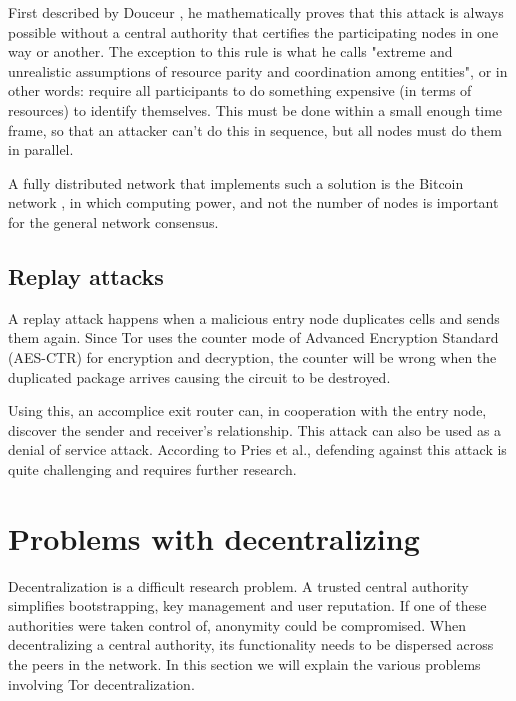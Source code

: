 \documentclass[12pt,journal,compsoc]{IEEEtran}
\begin{document}
		First described by Douceur \cite{douceur2002sybil}, he mathematically proves that this attack is always possible without a central authority that certifies the participating nodes in one way or another. The exception to this rule is what he calls "extreme and unrealistic assumptions of resource parity and coordination among entities", or in other words: require all participants to do something expensive (in terms of resources) to identify themselves. This must be done within a small enough time frame, so that an attacker can't do this in sequence, but all nodes must do them in parallel.
		
		A fully distributed network that implements such a solution is the Bitcoin network \cite{nakamoto2008bitcoin}, in which computing power, and not the number of nodes is important for the general network consensus.
				
	\subsection{Replay attacks}
		A replay attack \cite{pries2008new} happens when a malicious entry node duplicates cells and sends them again. Since Tor uses the counter mode of Advanced Encryption Standard (AES-CTR) for encryption and decryption, the counter will be wrong when the duplicated package arrives causing the circuit to be destroyed.

		Using this, an accomplice exit router can, in cooperation with the entry node, discover the sender and receiver's relationship. This attack can also be used as a denial of service attack. According to Pries et al., defending against this attack is quite challenging and requires further research.

\section{Problems with decentralizing}
	\label{sec:problems}

	Decentralization is a difficult research problem. A trusted central authority simplifies bootstrapping, key management and user reputation. If one of these authorities were taken control of, anonymity could be compromised. When decentralizing a central authority, its functionality needs to be dispersed across the peers in the network. In this section we will explain the various problems involving Tor decentralization.
	
\end{document}
